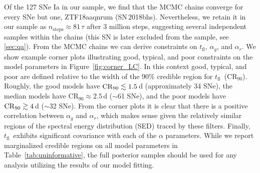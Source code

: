 \documentclass[twocolumn]{./aastex63}
\newcommand{\tfl}{$t_\mathrm{fl}$}
\begin{document}
Of the 127 SNe Ia in our sample, we find that the MCMC chains converge for
every SNe but one, ZTF18aaqnrum (SN\,2018bhs). Nevertheless, we retain it in
our sample as $n_\mathrm{steps} \approx 81 \,\tau$ after 3 million steps,
suggesting several independent samples within the chains (this SN is later
excluded from the sample, see \ref{sec:qa}). From the MCMC chains we can
derive constraints on \tfl, $\alpha_g$, and $\alpha_r$. We show example corner
plots illustrating good, typical, and poor constraints on the model parameters
in Figure~\ref{fig:corner_LC}. In this context good, typical, and poor are
defined relative to the width of the 90\% credible region for \tfl\
($\mathrm{CR}_{90}$). Roughly, the good models have $\mathrm{CR}_{90} \lesssim
1.5$\,d (approximately 34 SNe), the median models have $\mathrm{CR}_{90}
\approx 2.5$\,d ($\sim$61 SNe), and the poor models have $\mathrm{CR}_{90} \gtrsim
4$\,d ($\sim$32 SNe). From the corner plots it is clear that there is a
positive correlation between $\alpha_g$ and $\alpha_r$, which makes sense
given the relatively similar regions of the spectral energy distribution (SED)
traced by these filters. Finally, \tfl\ exhibits significant covariance with
each of the $\alpha$ parameters. While we report marginalized credible regions
on all model parameters in Table~\ref{tab:uninformative}, the full posterior
samples should be used for any analysis utilizing the results of our model
fitting.
\end{document}
